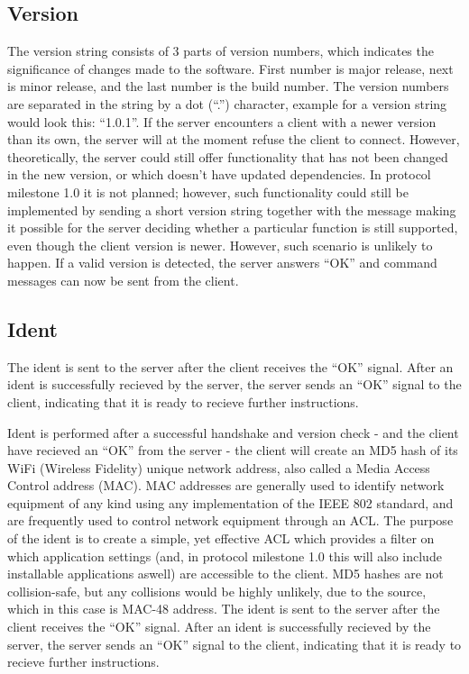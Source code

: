 \subsection{Version} 
The version string consists of 3 parts of version numbers, which indicates the significance of changes made to the software. First number is major release, next is minor release, and the last number is the build number. The version numbers are separated in the string by a dot (``.'') character, example for a version string would look this: ``1.0.1''. If the server encounters a client with a newer version than its own, the server will at the moment refuse the client to connect. However, theoretically, the server could still offer functionality that has not been changed in the new version, or which doesn't have updated dependencies. In protocol milestone 1.0 it is not planned; however, such functionality could still be implemented by sending a short version string together with the message making it possible for the server deciding whether a particular function is still supported, even though the client version is newer. However, such scenario is unlikely to happen. 
If a valid version is detected, the server answers ``OK'' and command messages can now be sent from the client.

\subsection{Ident}

The ident is sent to the server after the client receives the ``OK'' signal. After an ident is successfully recieved by the server, the server sends an ``OK'' signal to the client, indicating that it is ready to recieve further instructions. 

Ident is performed after a successful handshake and version check - and the client have recieved an ``OK'' from the server - the client will create an MD5 hash of its WiFi (Wireless Fidelity) unique network address, also called a Media Access Control address (MAC). MAC addresses are generally used to identify network equipment of any kind using any implementation of the IEEE 802 standard\cite{IEEE}, and are frequently used to control network equipment through an ACL\cite{cisco}. The purpose of the ident is to create a simple, yet effective ACL which provides a filter on which application settings (and, in protocol milestone 1.0 this will also include installable applications aswell) are accessible to the client. MD5 hashes are not collision-safe\cite{ACCESSDATA}, but any collisions would be highly unlikely, due to the source, which in this case is MAC-48 address. 
The ident is sent to the server after the client receives the ``OK'' signal. After an ident is successfully recieved by the server, the server sends an ``OK'' signal to the client, indicating that it is ready to recieve further instructions. 

